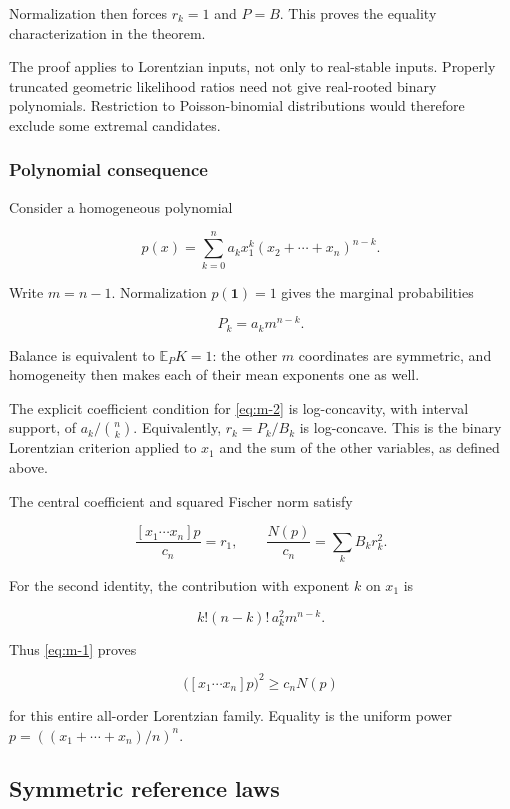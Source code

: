 \documentclass[11pt,a4paper]{article}
\theoremstyle{definition}
\theoremstyle{remark}
\begin{document}
Normalization then forces \(r_k=1\) and \(P=B\). This proves the
equality characterization in the theorem.

The proof applies to Lorentzian inputs, not only to real-stable inputs.
Properly truncated geometric likelihood ratios need not give real-rooted binary polynomials.
Restriction to Poisson-binomial distributions would therefore exclude some extremal candidates.

\subsubsection{Polynomial consequence}\label{scalar-polynomial-consequence}

Consider a homogeneous polynomial

\begin{equation}\label{eq:m-2}
p(x)=\sum_{k=0}^na_kx_1^k
       (x_2+\cdots+x_n)^{n-k}.
\end{equation}

Write \(m=n-1\). Normalization \(p(\mathbf1)=1\) gives the marginal
probabilities

\[
P_k=a_km^{n-k}.
\]

Balance is equivalent to \(\mathbb E_PK=1\): the other \(m\) coordinates
are symmetric, and homogeneity then makes each of their mean exponents
one as well.

The explicit coefficient condition for \eqref{eq:m-2} is log-concavity, with
interval support, of \(a_k/\binom nk\). Equivalently, \(r_k=P_k/B_k\) is
log-concave. This is the binary Lorentzian criterion applied to \(x_1\)
and the sum of the other variables, as defined above.

The central coefficient and squared Fischer norm satisfy

\begin{equation}\label{eq:m-3}
\frac{[x_1\cdots x_n]p}{c_n}=r_1,
\qquad
\frac{N(p)}{c_n}=\sum_kB_kr_k^2.
\end{equation}

For the second identity, the contribution with exponent \(k\) on \(x_1\)
is

\[
k!(n-k)!\,a_k^2m^{n-k}.
\]

Thus \eqref{eq:m-1} proves

\[
\bigl([x_1\cdots x_n]p\bigr)^2\ge c_nN(p)
\]

for this entire all-order Lorentzian family. Equality is the uniform
power \(p=((x_1+\cdots+x_n)/n)^n\).


\subsection{Symmetric reference laws}\label{scalar-symmetric-reference-laws}
\end{document}
